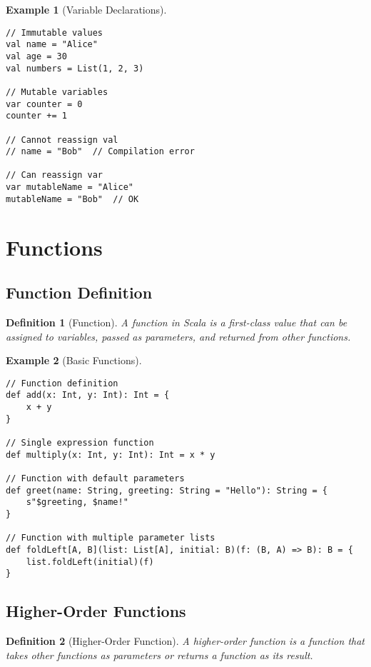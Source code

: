 \documentclass[11pt]{article}
\newtheorem{definition}{Definition}[section]
\newtheorem{example}{Example}[section]
\begin{document}
\begin{example}[Variable Declarations]
\begin{lstlisting}
// Immutable values
val name = "Alice"
val age = 30
val numbers = List(1, 2, 3)

// Mutable variables
var counter = 0
counter += 1

// Cannot reassign val
// name = "Bob"  // Compilation error

// Can reassign var
var mutableName = "Alice"
mutableName = "Bob"  // OK
\end{lstlisting}
\end{example}

\section{Functions}

\subsection{Function Definition}

\begin{definition}[Function]
A function in Scala is a first-class value that can be assigned to variables, passed as parameters, and returned from other functions.
\end{definition}

\begin{example}[Basic Functions]
\begin{lstlisting}
// Function definition
def add(x: Int, y: Int): Int = {
    x + y
}

// Single expression function
def multiply(x: Int, y: Int): Int = x * y

// Function with default parameters
def greet(name: String, greeting: String = "Hello"): String = {
    s"$greeting, $name!"
}

// Function with multiple parameter lists
def foldLeft[A, B](list: List[A], initial: B)(f: (B, A) => B): B = {
    list.foldLeft(initial)(f)
}
\end{lstlisting}
\end{example}

\subsection{Higher-Order Functions}

\begin{definition}[Higher-Order Function]
A higher-order function is a function that takes other functions as parameters or returns a function as its result.
\end{definition}
\end{document}
